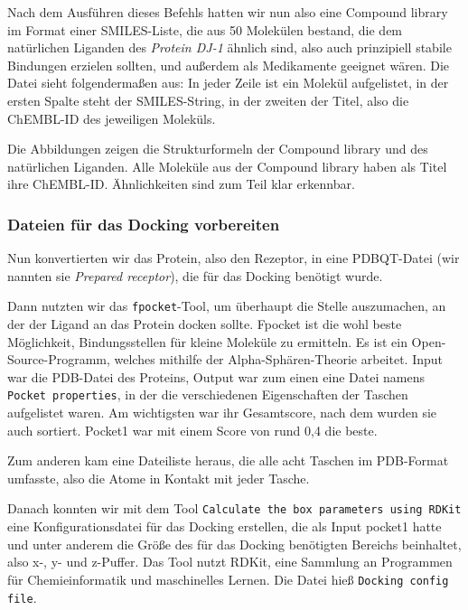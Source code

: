 \documentclass[10pt]{article}
\begin{document}
    Nach dem Ausführen dieses Befehls hatten wir nun also eine Compound library im Format einer SMILES-Liste, die aus
    50 Molekülen bestand, die dem natürlichen Liganden des \emph{Protein DJ-1} ähnlich sind, also auch
    prinzipiell
    stabile Bindungen erzielen sollten, und außerdem als Medikamente geeignet wären. Die Datei sieht folgendermaßen
    aus: In jeder Zeile ist ein Molekül aufgelistet, in der ersten Spalte steht der SMILES-String, in der zweiten der
    Titel, also die ChEMBL-ID des jeweiligen Moleküls.

    Die Abbildungen zeigen die Strukturformeln der Compound library und des natürlichen Liganden. Alle Moleküle aus der
    Compound library haben als Titel ihre ChEMBL-ID. Ähnlichkeiten sind zum Teil klar erkennbar.

    \subsubsection{Dateien für das Docking vorbereiten}\label{subsubsec:dateien-fuer-das-docking-vorbereiten}

    Nun konvertierten wir das Protein, also den Rezeptor, in eine PDBQT-Datei (wir nannten sie \emph{Prepared
    receptor}),
    die für das Docking benötigt wurde.

    Dann nutzten wir das \texttt{fpocket}-Tool, um überhaupt die Stelle auszumachen, an der der Ligand an das Protein
    docken
    sollte.\cite{16} Fpocket ist die wohl beste Möglichkeit, Bindungsstellen für kleine Moleküle zu ermitteln. Es
    ist ein
    Open-Source-Programm, welches mithilfe der Alpha-Sphären-Theorie arbeitet. Input war die PDB-Datei des Proteins,
    Output war zum einen eine Datei namens \texttt{Pocket properties}, in der die verschiedenen Eigenschaften der
    Taschen
    aufgelistet waren. Am wichtigsten war ihr Gesamtscore, nach dem wurden sie auch sortiert. Pocket1 war mit einem
    Score von rund 0,4 die beste.

    Zum anderen kam eine Dateiliste heraus, die alle acht Taschen im PDB-Format umfasste, also die Atome in Kontakt mit
    jeder Tasche.

    Danach konnten wir mit dem Tool \texttt{Calculate the box parameters using RDKit} eine Konfigurationsdatei für
    das Docking
    erstellen, die als Input pocket1 hatte und unter anderem die Größe des für das Docking benötigten Bereichs
    beinhaltet, also x-, y- und z-Puffer.\cite{15} Das Tool nutzt RDKit, eine Sammlung an Programmen für
    Chemieinformatik und
    maschinelles Lernen.\cite{14} Die Datei hieß \texttt{Docking config file}.
\end{document}
